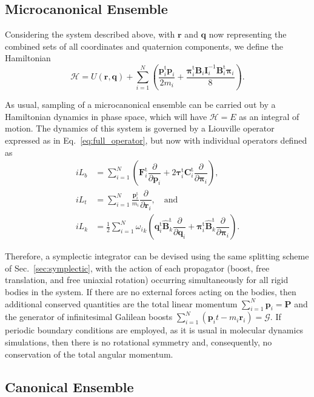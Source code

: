 \documentclass[aip,jcp,reprint,amsmath,amssymb]{revtex4-1}
\newcommand{\mt}[1]{\boldsymbol{\mathbf{#1}}}           %
\newcommand{\vt}[1]{\boldsymbol{\mathbf{#1}}}           %
\newcommand{\tr}[1]{#1^\text{t}}                        %
\newcommand{\diff}[2]{\dfrac{\partial #1}{\partial #2}} %
\begin{document}
\subsection{Microcanonical Ensemble}

Considering the system described above, with $\vt r$ and $\vt q$ now representing the combined sets of all coordinates and quaternion components, we define the Hamiltonian
\begin{equation}
\label{eq:H_NVE}
\mathcal{H} = U(\vt r,\vt q) + \sum_{i=1}^N \left(\frac{\tr{\vt p}_i{\vt p}_i}{2m_i} + \frac{\tr{\vt \pi}_i {\mt B}_i {\mt I}_i^{-1} \tr{\mt B}_i {\vt \pi}_i}{8}\right).
\end{equation}

As usual, sampling of a microcanonical ensemble can be carried out by a Hamiltonian dynamics in phase space, which will have $\mathcal{H} = E$ as an integral of motion. The dynamics of this system is governed by a Liouville operator expressed as in Eq.~\ref{eq:full_operator}, but now with individual operators defined as
\[
\begin{split}
i\!L_b &= \sum_{i=1}^N \left( \tr{\vt F}_i \diff{}{\vt p_i} + 2 \tr{\vt \tau}_i \tr{\mt C}_i \diff{}{\vt \pi_i} \right), \\
i\!L_t &= \sum_{i=1}^N \frac{\tr{\vt p}_i}{m_i}\diff{}{\vt r_i}, \quad \text{and} \\
i\!L_k &= \frac{1}{2} \sum_{i=1}^N {\omega_i}_k \left( \tr{\vt q}_i\tr{\hat{\mt B}_k} \diff{}{\vt q_i} + \tr{\vt \pi_i}\tr{\hat{\mt B}_k} \diff{}{\vt \pi_i} \right).
\end{split}
\]

Therefore, a symplectic integrator can be devised using the same splitting scheme of Sec.~\ref{sec:symplectic}, with the action of each propagator (boost, free translation, and free uniaxial rotation) occurring simultaneously for all rigid bodies in the system. If there are no external forces acting on the bodies, then additional conserved quantities are the total linear momentum $\sum_{i=1}^N \vt p_i = \vt P$ and the generator of infinitesimal Galilean boosts\cite{Ray1999, Schwichtenberg2015} $\sum_{i=1}^N(\vt p_i t - m_i \vt r_i) = \boldsymbol{\mathcal G}$. If periodic boundary conditions are employed, as it is usual in molecular dynamics simulations, then there is no rotational symmetry and, consequently, no conservation of the total angular momentum.

\subsection{Canonical Ensemble}
\label{sec:canonical}
\end{document}
